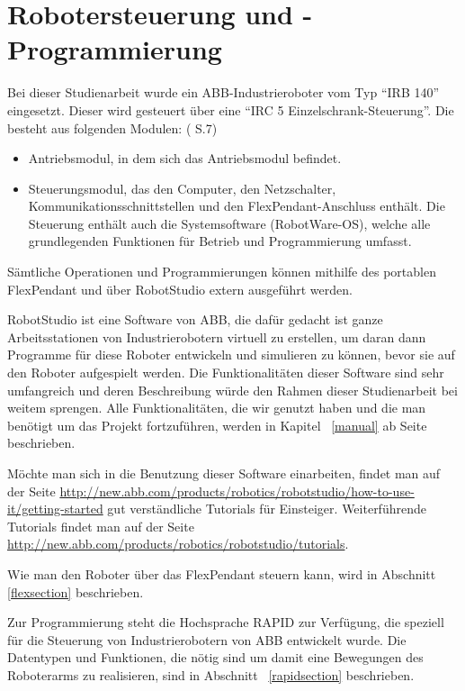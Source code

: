
\chapter{Robotersteuerung und -Programmierung}
Bei dieser Studienarbeit wurde ein ABB-Industrieroboter vom Typ \enquote{IRB 140} eingesetzt. Dieser wird gesteuert über eine \enquote{IRC 5 Einzelschrank-Steuerung}. Die besteht aus folgenden Modulen: (\cite{irc5} S.7)

\begin{itemize}
\item Antriebsmodul, in dem sich das Antriebsmodul befindet.

\item Steuerungsmodul, das den Computer, den Netzschalter, Kommunikationsschnittstellen und den FlexPendant-Anschluss enthält. Die Steuerung enthält auch die Systemsoftware (RobotWare-OS), welche alle grundlegenden Funktionen für Betrieb und Programmierung umfasst.
\end{itemize}

Sämtliche Operationen und Programmierungen können mithilfe des portablen FlexPendant und über RobotStudio extern ausgeführt werden. 

RobotStudio ist eine Software von ABB, die dafür gedacht ist ganze Arbeitsstationen von Industrierobotern virtuell zu erstellen, um daran dann Programme für diese Roboter entwickeln und simulieren zu können, bevor sie auf den Roboter aufgespielt werden. Die Funktionalitäten dieser Software sind sehr umfangreich und deren Beschreibung würde den Rahmen dieser Studienarbeit bei weitem sprengen. Alle Funktionalitäten, die wir genutzt haben und die man benötigt um das Projekt fortzuführen, werden in Kapitel ~\ref{manual} ab Seite ~\pageref{manual} beschrieben. 

Möchte man sich in die Benutzung dieser Software einarbeiten, findet man auf der Seite \href{http://new.abb.com/products/robotics/robotstudio/how-to-use-it/getting-started}{http://new.abb.com/products/robotics/robotstudio/how-to-use-it/getting-started} gut verständliche Tutorials für Einsteiger. Weiterführende Tutorials findet man auf der Seite \href{http://new.abb.com/products/robotics/robotstudio/tutorials}{http://new.abb.com/products/robotics/robotstudio/tutorials}.

Wie man den Roboter über das FlexPendant steuern kann, wird in Abschnitt \ref{flexsection} beschrieben.

Zur Programmierung steht die Hochsprache RAPID zur Verfügung, die speziell für die Steuerung von Industrierobotern von ABB entwickelt wurde. Die Datentypen und Funktionen, die nötig sind um damit eine Bewegungen des Roboterarms zu realisieren, sind in Abschnitt ~\ref{rapidsection} beschrieben.


